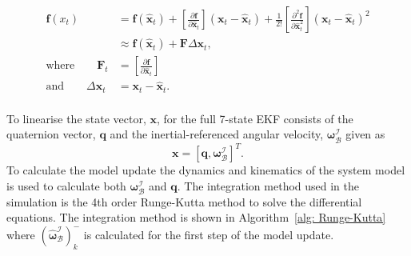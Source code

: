 \begin{equation}
	\begin{aligned}
		\mathbf{f}(x_t) &= \mathbf{f}(\hat{\mathbf{x}}_t) + \left[\frac{\partial \mathbf{f}}{\partial \hat{\mathbf{x}}_t} \right] \left(\mathbf{x}_t - \hat{\mathbf{x}}_t \right) + \frac{1}{2!} \left[\frac{\partial^2 \mathbf{f}}{\partial \hat{\mathbf{x}}_t^2} \right] \left(\mathbf{x}_t - \hat{\mathbf{x}}_t \right)^2 \\
		&\approx \mathbf{f} (\hat{\mathbf{x}}_t) + \mathbf{F} \Delta \mathbf{x}_t , \\
		\text{where} \qquad \mathbf{F}_t &= \left[\frac{\partial \mathbf{f}}{\partial \hat{\mathbf{x}}_t} \right] \\
		\text{and} \qquad \Delta \mathbf{x}_t &= \mathbf{x}_t - \hat{\mathbf{x}}_t. \\
	\end{aligned}
\end{equation}


To linearise the state vector, $\mathbf{x}$, for the full 7-state EKF consists of the quaternion vector, $\mathbf{q}$ and the inertial-referenced angular velocity, $\boldsymbol{\omega}_{\mathcal{B}}^{\mathcal{I}}$ given as
\begin{equation}
	\mathbf{x} = [\mathbf{q}, \boldsymbol{\omega}_{\mathcal{B}}^{\mathcal{I}}]^T.
\end{equation}
To calculate the model update the dynamics and kinematics of the system model is used to calculate both $\boldsymbol{\omega}_{\mathcal{B}}^{\mathcal{I}}$ and $\mathbf{q}$. The integration method used in the simulation is the 4th order Runge-Kutta method to solve the differential equations. The integration method is shown in Algorithm~\ref{alg: Runge-Kutta} where $(\boldsymbol{\hat{\omega}}_{\mathcal{B}}^{\mathcal{I}})_k^-$ is calculated for the first step of the model update.

